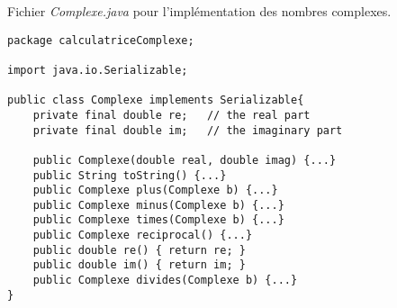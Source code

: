 \documentclass{article}
\begin{document}
Fichier \emph{Complexe.java} pour l'implémentation des nombres complexes.
\begin{lstlisting}
package calculatriceComplexe;

import java.io.Serializable;

public class Complexe implements Serializable{
    private final double re;   // the real part
    private final double im;   // the imaginary part

    public Complexe(double real, double imag) {...}
    public String toString() {...}
    public Complexe plus(Complexe b) {...}
    public Complexe minus(Complexe b) {...}
    public Complexe times(Complexe b) {...}
    public Complexe reciprocal() {...}
    public double re() { return re; }
    public double im() { return im; }
    public Complexe divides(Complexe b) {...}
}

\end{lstlisting}
\end{document}
